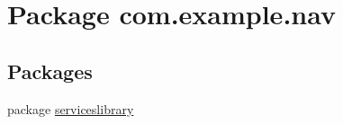 \hypertarget{namespacecom_1_1example_1_1nav}{}\section{Package com.\+example.\+nav}
\label{namespacecom_1_1example_1_1nav}
\subsection*{Packages}
\begin{DoxyCompactItemize}
\item 
package \hyperlink{namespacecom_1_1example_1_1nav_1_1serviceslibrary}{serviceslibrary}
\end{DoxyCompactItemize}
